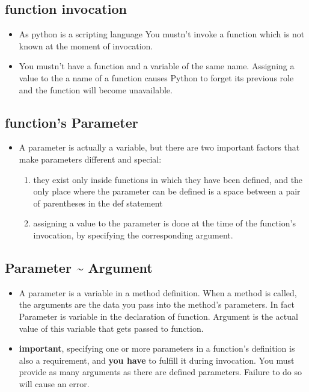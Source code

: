 \documentclass[11pt]{article}
\begin{document}
\subsection{function invocation}
\label{sec:org3bb6219}
\begin{itemize}
\item As python is a scripting language You mustn’t invoke a function
which is not known at the moment of invocation.
\item You mustn’t have a function and a variable of the same
name. Assigning a value to the a name of a function causes Python
to forget its previous role and the function will become
unavailable.
\end{itemize}
\subsection{function's Parameter}
\label{sec:org4b3b89e}
\begin{itemize}
\item A parameter is actually a variable, but there are two important
factors that make parameters different and special:
\begin{enumerate}
\item they exist only inside functions in which they have been
defined, and the only place where the parameter can be
defined is a space between a pair of parentheses in the def
statement
\item assigning a value to the parameter is done at the time of the
function’s invocation, by specifying the corresponding
argument.
\end{enumerate}
\end{itemize}

\subsection{Parameter \textasciitilde{} Argument}
\label{sec:org8a07c59}
\begin{itemize}
\item A parameter is a variable in a method definition. When a method is
called, the arguments are the data you pass into the method's
parameters. In fact Parameter is variable in the declaration of
function. Argument is the actual value of this variable that gets
passed to function.
\item \textbf{important}, specifying one or more parameters in a function’s
definition is also a requirement, and \textbf{you have} to fulfill it during
invocation. You must provide as many arguments as there are defined
parameters. Failure to do so will cause an error.
\end{itemize}
\end{document}
